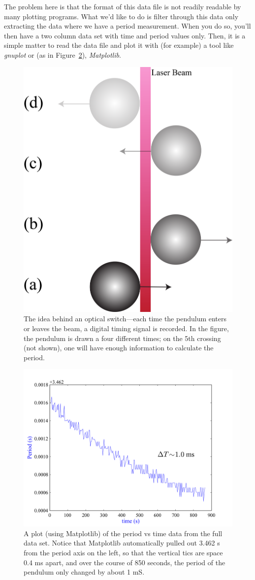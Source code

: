 The problem here is that the format of this data file is not readily readable by many plotting programs. What we'd like to do is filter through this data only extracting the data where we have a period measurement. When you do so, you'll then have a two column data set with time and period values only. Then, it is a simple matter to read the data file and plot it with (for example) a tool like {\em gnuplot} or (as in Figure~\ref{fig:Output}), {\em Matplotlib}. 
\begin{figure}[ht]
\sidecaption
  \includegraphics[width=.3\linewidth]{Figures/extractingData/OpticalSwitch.png}%
  \caption{The idea behind an optical switch---each time the pendulum enters or leaves the beam, a digital timing signal is recorded. In the figure, the pendulum is drawn a four different times; on the 5th crossing (not shown), one will have enough information to calculate the period.}
  \label{fig:opticalSwitch}%
\end{figure}

\begin{figure}[htb]
 \includegraphics[width=0.85\linewidth]{Figures/extractingData/Output.png}%
  \caption{A plot (using Matplotlib) of the period vs time data from the full data set. Notice that Matplotlib automatically pulled out 3.462 s from the period axis on the left, so that the vertical tics are space 0.4 ms apart, and over the course of 850 seconds, the period of the pendulum only changed by about 1 mS.}
  \label{fig:Output}%
\end{figure}


